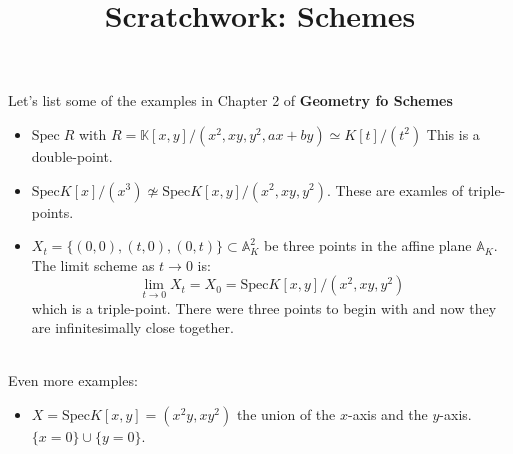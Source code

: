 \documentclass[12pt]{article}
\title{Scratchwork: Schemes}
\date{}
\begin{document}
\sffamily

\maketitle

\noindent 
Let's list some of the examples in Chapter 2 of \textbf{Geometry fo Schemes}
\begin{itemize}
\item $\text{Spec}\;R$ with $R = \mathbb{K}[x,y]/(x^2, xy, y^2, ax+by) \simeq K[t]/(t^2)$ This is a double-point.
\item $\text{Spec}K[x]/(x^3) \not\simeq \text{Spec}K[x,y]/(x^2,xy,y^2)$.  These are examles of triple-points.
\item $X_t = \{ (0,0), (t,0), (0,t) \} \subset \mathbb{A}_K^2$ be three points in the affine plane $\mathbb{A}_K$.  The limit scheme as $t \to 0$ is:
$$ \lim_{t \to 0} X_t = X_0 = \text{Spec}K[x,y]/(x^2, xy, y^2) $$
which is a triple-point. There were three points to begin with and now they are infinitesimally close together. 
\end{itemize}
 \\
Even more examples:
\begin{itemize}
\item $X = \text{Spec} K[x,y] = (x^2y, xy^2)$ the union of the $x$-axis and the $y$-axis. $\{ x = 0 \} \cup \{ y = 0 \}$.
\end{itemize}
\end{document}
